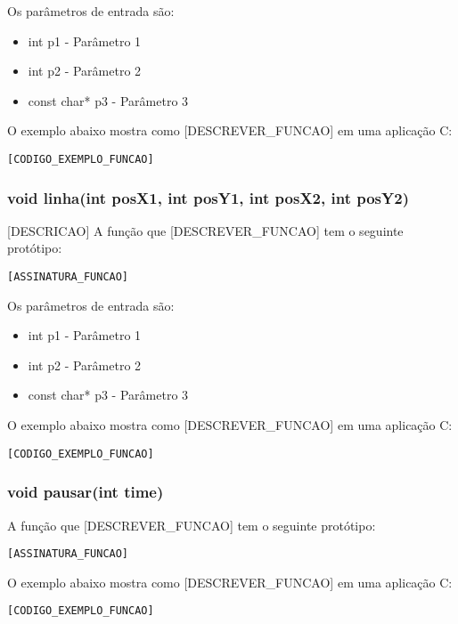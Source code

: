 \documentclass[12pt, %
openright,
oneside, %
a4paper,    %
brazil]{facom-ufu-abntex2}
\begin{document}
Os parâmetros de entrada são:

\begin{itemize}
    \item int p1 - Parâmetro 1
    \item int p2 - Parâmetro 2
    \item const char* p3 - Parâmetro 3
\end{itemize}

O exemplo abaixo mostra como [DESCREVER_FUNCAO] em uma aplicação C:

\begin{lstlisting}
[CODIGO_EXEMPLO_FUNCAO]
\end{lstlisting}

\subsubsection{void linha(int posX1, int posY1, int posX2, int posY2)}
[DESCRICAO]
A função que [DESCREVER_FUNCAO] tem o seguinte protótipo:

\begin{lstlisting}
[ASSINATURA_FUNCAO]
\end{lstlisting}

Os parâmetros de entrada são:

\begin{itemize}
    \item int p1 - Parâmetro 1
    \item int p2 - Parâmetro 2
    \item const char* p3 - Parâmetro 3
\end{itemize}

O exemplo abaixo mostra como [DESCREVER_FUNCAO] em uma aplicação C:

\begin{lstlisting}
[CODIGO_EXEMPLO_FUNCAO]
\end{lstlisting}


\subsubsection{void pausar(int time)}
A função que [DESCREVER_FUNCAO] tem o seguinte protótipo:

\begin{lstlisting}
[ASSINATURA_FUNCAO]
\end{lstlisting}

O exemplo abaixo mostra como [DESCREVER_FUNCAO] em uma aplicação C:

\begin{lstlisting}
[CODIGO_EXEMPLO_FUNCAO]
\end{lstlisting}
\end{document}
